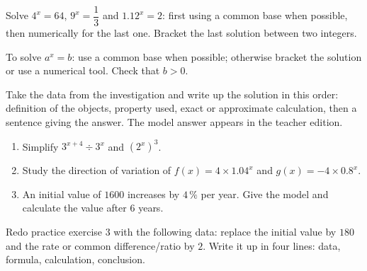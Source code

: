 \begin{activite}
Solve $4^x=64$, $9^x=\dfrac13$ and $1.12^x=2$: first using a common base when possible, then numerically for the last one. Bracket the last solution between two integers.

\end{activite}

\begin{traceecrite}To solve $a^x=b$: use a common base when possible; otherwise bracket the solution or use a numerical tool. Check that $b>0$.\end{traceecrite}

\begin{exemple}
Take the data from the investigation and write up the solution in this order: definition of the objects, property used, exact or approximate calculation, then a sentence giving the answer. The model answer appears in the teacher edition.
\end{exemple}

\begin{exercice}[-- essential]
\begin{enumerate}\item Simplify $3^{x+4}\div3^x$ and $(2^x)^3$.\item Study the direction of variation of $f(x)=4\times1.04^x$ and $g(x)=-4\times0.8^x$.\item An initial value of $1600$ increases by $4\,\%$ per year. Give the model and calculate the value after $6$ years.\end{enumerate}
\end{exercice}


\begin{dm}Redo practice exercise 3 with the following data: replace the initial value by $180$ and the rate or common difference/ratio by $2$. Write it up in four lines: data, formula, calculation, conclusion.\end{dm}

